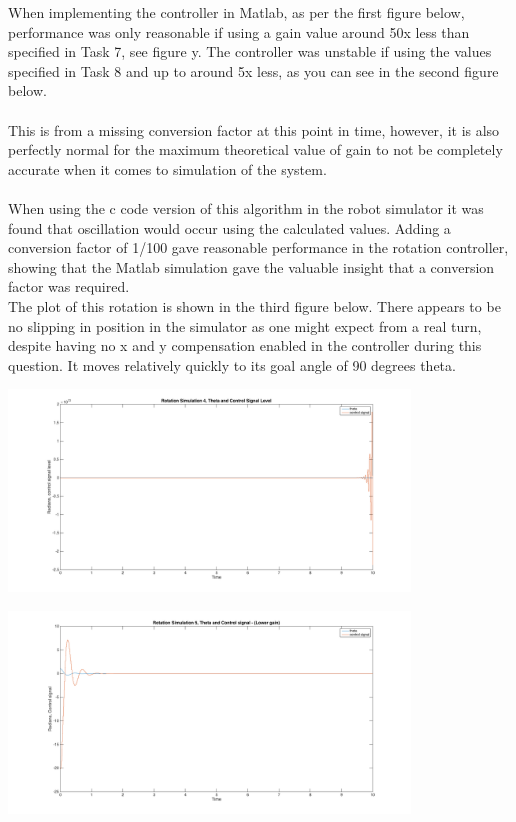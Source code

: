 \documentclass[a4paper,12pt,oneside,onecolumn]{article} %
\begin{document}
When implementing the controller in Matlab, as per the first figure below, performance was only reasonable if using a gain value around 50x less than specified in Task 7, see figure y. The controller was unstable if using the values specified in Task 8 and up to around 5x less, as you can see in the second figure below.\\
\\
This is from a missing conversion factor at this point in time, however, it is also perfectly normal for the maximum theoretical value of gain to not be completely accurate when it comes to simulation of the system.\\
\\
When using the c code version of this algorithm in the robot simulator it was found that oscillation would occur using the calculated values. Adding a conversion factor of 1/100 gave reasonable performance in the rotation controller, showing that the Matlab simulation gave the valuable insight that a conversion factor was required.
\\
The plot of this rotation is shown in the third figure below. There appears to be no slipping in position in the simulator as one might expect from a real turn, despite having no x and y compensation enabled in the controller during this question. It moves relatively quickly to its goal angle of 90 degrees theta.
 \begin{center}
  \includegraphics[width = 0.8\textwidth]{q8plot}
 \end{center}
  \begin{center}
  \includegraphics[width = 0.8\textwidth]{q8plot2}
 \end{center}
\end{document}
